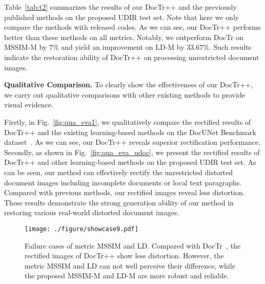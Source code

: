 \documentclass[lettersize,journal]{IEEEtran}
\begin{document}
Table~\ref{tab:t2} summarizes the results of our DocTr++ and the previously published methods on the proposed UDIR test set.
Note that here we only compare the methods with released codes.
As we can see,
our DocTr++ performs better than these methods on all metrics.
Notably, we outperform DocTr on MSSIM-M by $7\%$ and yield an improvement on LD-M by $33.67\%$.
Such results indicate the restoration ability of DocTr++ on processing unrestricted document images.


\smallskip
\textbf{Qualitative Comparison.}
To clearly show the effectiveness of our DocTr++, we carry out qualitative comparisons with other existing methods to provide visual evidence.

Firstly, in Fig.~\ref{fig:qua_eva1}, we qualitatively compare the rectified results of DocTr++ and the existing learning-based methods on the DocUNet Benchmark dataset~\cite{8578592}.
As we can see, our DocTr++ reveals superior rectification performance.
Secondly, as shown in Fig.~\ref{fig:qua_eva_udoc}, we present the rectified results of DocTr++ and other learning-based methods on the proposed UDIR test set. As can be seen, our method can effectively rectify the unrestricted distorted document images including incomplete documents or local text paragraphs.
Compared with previous methods, our rectified images reveal less distortion.
These results demonstrate the strong generation ability of our method in restoring various real-world distorted document images.


\begin{figure}[t]
  \centering
  \texttt{[image: ./figure/showcase9.pdf]}
  \caption{Failure cases of metric MSSIM and LD. Compared with DocTr~\cite{feng2021doctr}, the rectified images of DocTr++ show less distortion. However, the metric MSSIM and LD can not well perceive their difference, while the proposed MSSIM-M and LD-M are more robust and reliable.}
  \label{fig:metric_aba}
\end{figure}
\end{document}
